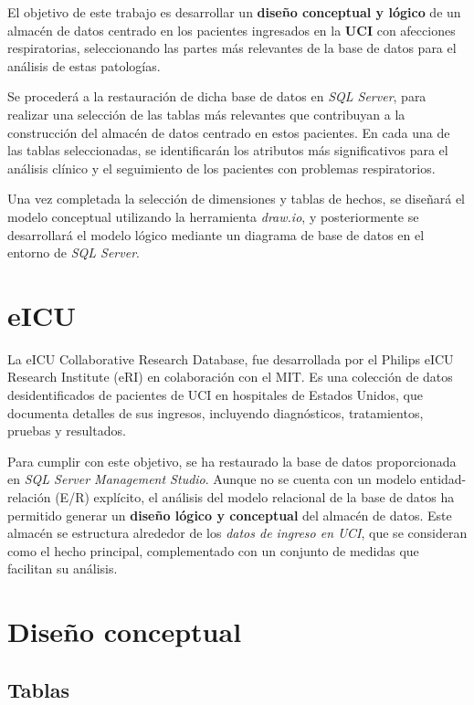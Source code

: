 \documentclass[12pt, a4paper, twoside]{article}
\begin{document}
	El objetivo de este trabajo es desarrollar un \textbf{diseño conceptual y lógico} de un almacén de datos centrado en los pacientes ingresados en la \textbf{UCI} con afecciones respiratorias, seleccionando las partes más relevantes de la base de datos para el análisis de estas patologías.
	
	Se procederá a la restauración de dicha base de datos en \textit{SQL Server}, para realizar una selección de las tablas más relevantes que contribuyan a la construcción del almacén de datos centrado en estos pacientes. En cada una de las tablas seleccionadas, se identificarán los atributos más significativos para el análisis clínico y el seguimiento de los pacientes con problemas respiratorios. 
	
	Una vez completada la selección de dimensiones y tablas de hechos, se diseñará el modelo conceptual utilizando la herramienta \textit{draw.io}, y posteriormente se desarrollará el modelo lógico mediante un diagrama de base de datos en el entorno de \textit{SQL Server}. 
	
	
	
	\section{eICU}
	
	La eICU Collaborative Research Database, fue desarrollada por el Philips eICU Research Institute (eRI) en colaboración con el MIT. Es una colección de datos desidentificados de pacientes de UCI en hospitales de Estados Unidos, que documenta detalles de sus ingresos, incluyendo diagnósticos, tratamientos, pruebas y resultados.
	
	Para cumplir con este objetivo, se ha restaurado la base de datos proporcionada en \textit{SQL Server Management Studio}. Aunque no se cuenta con un modelo entidad-relación (E/R) explícito, el análisis del modelo relacional de la base de datos ha permitido generar un \textbf{diseño lógico y conceptual} del almacén de datos. Este almacén se estructura alrededor de los \textit{datos de ingreso en UCI}, que se consideran como el hecho principal, complementado con un conjunto de medidas que facilitan su análisis.
	
	
	\section{Diseño conceptual}
	
	\subsection{Tablas}
	
\end{document}
